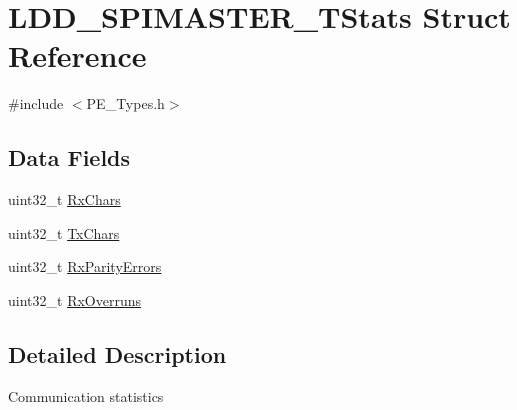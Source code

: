 \hypertarget{struct_l_d_d___s_p_i_m_a_s_t_e_r___t_stats}{\section{L\-D\-D\-\_\-\-S\-P\-I\-M\-A\-S\-T\-E\-R\-\_\-\-T\-Stats Struct Reference}
\label{struct_l_d_d___s_p_i_m_a_s_t_e_r___t_stats}
}


{\ttfamily \#include $<$P\-E\-\_\-\-Types.\-h$>$}

\subsection*{Data Fields}
\begin{DoxyCompactItemize}
\item 
uint32\-\_\-t \hyperlink{struct_l_d_d___s_p_i_m_a_s_t_e_r___t_stats_a6faa4c57f364f06f5cd3770a7686ef6f}{Rx\-Chars}
\item 
uint32\-\_\-t \hyperlink{struct_l_d_d___s_p_i_m_a_s_t_e_r___t_stats_af5376883e99d71f857999d58b2888f95}{Tx\-Chars}
\item 
uint32\-\_\-t \hyperlink{struct_l_d_d___s_p_i_m_a_s_t_e_r___t_stats_a83f9f4b7598e6d84e6842539cc54619f}{Rx\-Parity\-Errors}
\item 
uint32\-\_\-t \hyperlink{struct_l_d_d___s_p_i_m_a_s_t_e_r___t_stats_a528cf1d78c49b42ae455ba895987ece5}{Rx\-Overruns}
\end{DoxyCompactItemize}


\subsection{Detailed Description}
Communication statistics 

